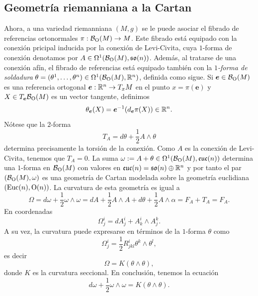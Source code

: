 \documentclass[11pt,a4paper]{amsbook}
\theoremstyle{remark} \newtheorem{rmk}[subsection]{Observación}
\theoremstyle{definition} \newtheorem{defn}[subsection]{Definición}
\theoremstyle{definition} \newtheorem{ex}[subsection]{Ejemplo}
\theoremstyle{definition} \newtheorem{ej}[subsection]{Ejercicio}
\begin{document}
\subsection{Geometría riemanniana a la Cartan} Ahora, a una variedad riemanniana $(M,g)$ se le puede asociar el fibrado de referencias ortonormales $\pi:\mathcal B_{\operatorname{O}}(M)\rightarrow M$. Este fibrado está equipado con la conexión pricipal inducida por la conexión de Levi-Civita, cuya $1$-forma de conexión denotamos por $A \in \Omega^1(\mathcal B_{\operatorname{O}}(M),\mathfrak{so}(n))$. Además, al tratarse de una conexión afín, el fibrado de referencias está equipado también con la \emph{$1$-forma de soldadura} $\theta=(\theta^1,\dots,\theta^n)\in \Omega^1(\mathcal B_{\operatorname{O}}(M),\mathbb R^n)$, definida como sigue. Si $\bm{e} \in \mathcal B_{\operatorname{O}}(M)$ es una referencia ortogonal $\bm{e}:\mathbb R^n\rightarrow T_xM$ en el punto $x=\pi(\bm{e})$ y $X\in T_{\bm{e}}\mathcal B_{\operatorname{O}}(M)$ es un vector tangente, definimos
\begin{equation*}
\theta_{\bm{e}}(X) = \bm{e}^{-1}(d_{\bm{e}}\pi(X)) \in \mathbb R^n.
\end{equation*}
Nótese que la $2$-forma
\begin{equation*}
T_A = d\theta + \frac{1}{2}A\wedge \theta
\end{equation*}
determina precisamente la torsión de la conexión. Como $A$ es la conexión de Levi-Civita, tenemos que $T_A=0$.
La suma $\omega:= A + \theta \in \Omega^1(\mathcal B_{\operatorname{O}}(M),\mathfrak{euc}(n))$ determina una $1$-forma en $\mathcal B_{\operatorname{O}}(M)$ con valores en $\mathfrak{euc}(n)=\mathfrak{so}(n) \oplus \mathbb R^n$ y por tanto el par $(\mathcal B_{\operatorname{O}}(M),\omega)$ es una geometría de Cartan modelada sobre la geometría euclidiana $(\mathrm{Euc}(n),\operatorname{O}(n))$. La curvatura de esta geometría es igual a
\begin{equation*}
\Omega = d\omega + \frac{1}{2}\omega \wedge \omega = dA + \frac{1}{2}A\wedge A + d\theta + \frac{1}{2}A\wedge \alpha = F_A + T_A = F_A.
\end{equation*}
En coordenadas
\begin{equation*}
\Omega^i_j = dA^i_j + A^i_k \wedge A^k_j.
\end{equation*}
A su vez, la curvatura puede expresarse en términos de la $1$-forma $\theta$ como
\begin{equation*}
  \Omega^i_j= \frac{1}{2} R^i_{jkl} \theta^k\wedge \theta^l,
\end{equation*}
es decir
\begin{equation*}
\Omega = K (\theta\wedge \theta),
\end{equation*}
donde $K$ es la curvatura seccional. En conclusión, tenemos la ecuación
\begin{equation*}
d\omega + \frac{1}{2}\omega \wedge \omega = K(\theta \wedge \theta).
\end{equation*}
\end{document}
